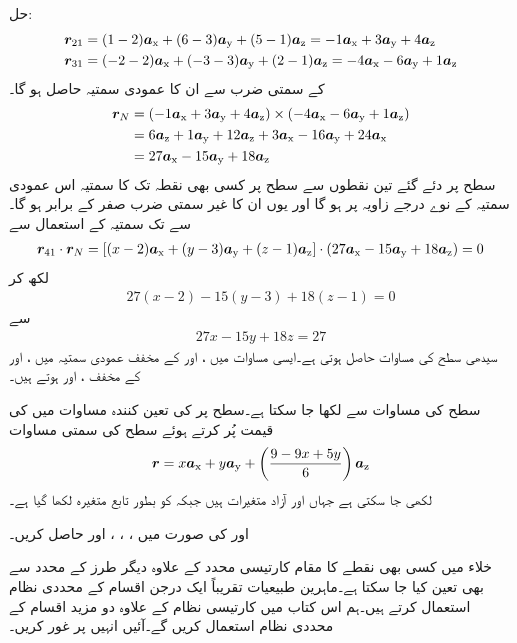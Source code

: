 حل:
\begin{align*}
\kvec{r}_{21}&=(1-2)\ax+(6-3)\ay+(5-1)\az=-1\ax+3\ay+4\az\\
\kvec{r}_{31}&=(-2-2)\ax+(-3-3)\ay+(2-1)\az=-4\ax-6\ay+1\az
\end{align*}
کے سمتی ضرب سے ان کا عمودی سمتیہ حاصل ہو گا۔
\begin{align*}
\kvec{r}_N&=(-1\ax+3\ay+4\az) \times (-4\ax-6\ay+1\az)\\
&=6\az+1\ay+12\az+3\ax-16\ay+24\ax\\
&=27\ax-15\ay+18\az
\end{align*}
سطح پر دئے گئے تین نقطوں سے سطح پر کسی بھی نقطہ  تک کا سمتیہ اس عمودی سمتیہ کے نوے درجے زاویہ پر ہو گا اور یوں ان کا غیر سمتی ضرب صفر کے برابر ہو گا۔ سے  تک سمتیہ  کے استعمال سے
\begin{align*}
\kvec{r}_{41} \cdot \kvec{r}_{N}=[(x-2)\ax+(y-3)\ay+(z-1)\az] \cdot (27\ax-15\ay+18\az)=0
\end{align*}
لکھ کر
\begin{align*}
27(x-2)-15(y-3)+18(z-1)=0
\end{align*}
سے
\begin{align*}
27x-15y+18z=27
\end{align*}
سیدھی سطح کی مساوات حاصل ہوتی ہے۔ایسی مساوات میں ،  اور  کے مخفف عمودی سمتیہ میں ،  اور  کے مخفف ،  اور  ہوتے ہیں۔

سطح کی مساوات سے  لکھا جا سکتا ہے۔سطح پر  کی تعین کنندہ مساوات  میں  کی قیمت پُر کرتے ہوئے  سطح کی سمتی مساوات 
\begin{align*}
\kvec{r}=x\ax+y\ay+\left(\frac{9-9x+5y}{6}\right)\az
\end{align*}
لکھی جا سکتی ہے جہاں  اور  آزاد متغیرات ہیں جبکہ  کو بطور تابع متغیرہ لکھا گیا ہے۔

 اور  کی صورت میں ، ، ،  اور  حاصل کریں۔ 

خلاء میں کسی بھی نقطے کا مقام کارتیسی محدد کے علاوہ دیگر طرز کے محدد سے بھی تعین کیا جا سکتا ہے۔ماہرین طبیعیات  تقریباً ایک درجن اقسام کے محددی نظام استعمال کرتے ہیں۔ہم اس کتاب میں کارتیسی نظام کے علاوہ دو مزید اقسام کے محددی نظام استعمال کریں گے۔آئیں انہیں پر غور کریں۔ 

